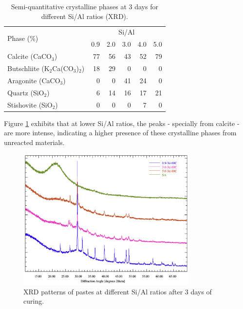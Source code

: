 \begin{table}[H]
    \centering
    \caption{Semi-quantitative crystalline phases at 3 days for different Si/Al ratios (XRD).}
    \label{tab:xrd_phases_pastes}
    \begin{tabular}{lrrrrr}
        \hline
        \multirow{2}{*}{Phase (\%)} &
        \multicolumn{5}{c}{Si/Al}\\
        \cline{2-6}
        & 0.9 & 2.0 & 3.0 & 4.0 & 5.0 \\
        \hline
        Calcite (CaCO$_3$) & 77 & 56 & 43 & 52 & 79 \\
        Butschliite (K$_2$Ca(CO$_3$)$_2$) & 18 & 29 & 0 & 0 & 0 \\
        Aragonite (CaCO$_3$) & 0 & 0 & 41 & 24 & 0 \\
        Quartz (SiO$_2$) & 6 & 14 & 16 & 17 & 21 \\
        Stishovite (SiO$_2$) & 0 & 0 & 0 & 7 & 0 \\
        \hline
    \end{tabular}
\end{table}

Figure \ref{fig:xrd_pastes} exhibits that at lower Si/Al ratios, the peaks - specially from calcite - are more intense, indicating a higher presence of these crystalline phases from unreacted materials.


\begin{figure}[H]
    \centering
    \includegraphics[width=0.8\textwidth]{Cap4/images/xrd_pastes_shifted.png}
    \caption{XRD patterns of pastes at different Si/Al ratios after 3 days of curing.}
    \label{fig:xrd_pastes}
\end{figure}

